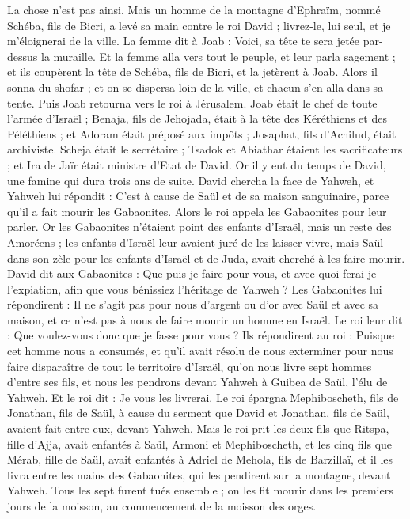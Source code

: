 \begin{multicols}{2}
La chose n'est pas ainsi. Mais un homme de la montagne d'Ephraïm, nommé Schéba, fils de Bicri, a levé sa main contre le roi David ; livrez-le, lui seul, et je m’éloignerai de la ville. La femme dit à Joab : Voici, sa tête te sera jetée par-dessus la muraille.
Et la femme alla vers tout le peuple, et leur parla sagement ; et ils coupèrent la tête de Schéba, fils de Bicri, et la jetèrent à Joab. Alors il sonna du shofar ; et on se dispersa loin de la ville, et chacun s'en alla dans sa tente. Puis Joab retourna vers le roi à Jérusalem.
Joab était le chef de toute l'armée d'Israël ; Benaja, fils de Jehojada, était à la tête des Kéréthiens et des Péléthiens ;
et Adoram était préposé aux impôts ; Josaphat, fils d'Achilud, était archiviste.
Scheja était le secrétaire ; Tsadok et Abiathar étaient les sacrificateurs ;
et Ira de Jaïr était ministre d’Etat de David.
\VerseOne{}Or il y eut du temps de David, une famine qui dura trois ans de suite. David chercha la face de Yahweh, et Yahweh lui répondit : C'est à cause de Saül et de sa maison sanguinaire, parce qu'il a fait mourir les Gabaonites.
Alors le roi appela les Gabaonites pour leur parler. Or les Gabaonites n'étaient point des enfants d'Israël, mais un reste des Amoréens ; les enfants d'Israël leur avaient juré de les laisser vivre, mais Saül dans son zèle pour les enfants d'Israël et de Juda, avait cherché à les faire mourir.
David dit aux Gabaonites : Que puis-je faire pour vous, et avec quoi ferai-je l’expiation, afin que vous bénissiez l'héritage de Yahweh ?
Les Gabaonites lui répondirent : Il ne s'agit pas pour nous d'argent ou d'or avec Saül et avec sa maison, et ce n'est pas à nous de faire mourir un homme en Israël. Le roi leur dit : Que voulez-vous donc que je fasse pour vous ?
Ils répondirent au roi : Puisque cet homme nous a consumés, et qu’il avait résolu de nous exterminer pour nous faire disparaître de tout le territoire d'Israël,
qu'on nous livre sept hommes d'entre ses fils, et nous les pendrons devant Yahweh à Guibea de Saül, l'élu de Yahweh. Et le roi dit : Je vous les livrerai.
Le roi épargna Mephiboscheth, fils de Jonathan, fils de Saül, à cause du serment que David et Jonathan, fils de Saül, avaient fait entre eux, devant Yahweh.
Mais le roi prit les deux fils que Ritspa, fille d'Ajja, avait enfantés à Saül, Armoni et Mephiboscheth, et les cinq fils que Mérab, fille de Saül, avait enfantés à Adriel de Mehola, fils de Barzillaï,
et il les livra entre les mains des Gabaonites, qui les pendirent sur la montagne, devant Yahweh. Tous les sept furent tués ensemble ; on les fit mourir dans les premiers jours de la moisson, au commencement de la moisson des orges.

\end{multicols}
